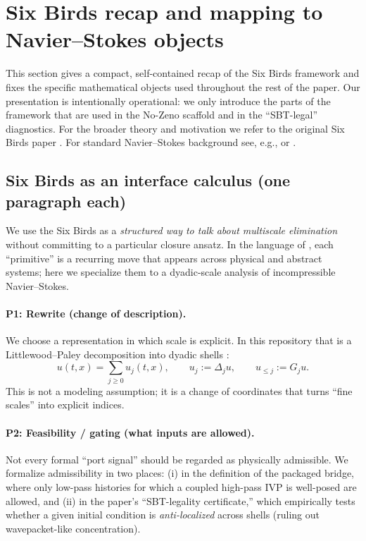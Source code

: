 \documentclass[11pt]{article}
\begin{document}
 \section{Six Birds recap and mapping to Navier--Stokes objects}
\label{sec:six_primitives_mapping}

This section gives a compact, self-contained recap of the Six Birds framework and fixes the specific mathematical objects used throughout the rest of the paper. Our presentation is intentionally operational: we only introduce the parts of the framework that are used in the No-Zeno scaffold and in the ``SBT-legal'' diagnostics. For the broader theory and motivation we refer to the original Six Birds paper \citep{tsiokos_2026_18365949}. For standard Navier--Stokes background see, e.g., \citet{temam_ns} or \citet{majda_bertozzi_vif}.

\subsection{Six Birds as an interface calculus (one paragraph each)}
\label{sec:six_primitives_recap}

We use the Six Birds as a \emph{structured way to talk about multiscale elimination} without committing to a particular closure ansatz. In the language of \citet{tsiokos_2026_18365949}, each ``primitive'' is a recurring move that appears across physical and abstract systems; here we specialize them to a dyadic-scale analysis of incompressible Navier--Stokes.

\paragraph{P1: Rewrite (change of description).}
We choose a representation in which scale is explicit. In this repository that is a Littlewood--Paley decomposition into dyadic shells \citep{bahouri2011fourier}:
\[
u(t,x)=\sum_{j\ge 0} u_j(t,x),\qquad u_j:=\Delta_j u,\qquad u_{\le j}:=G_j u.
\]
This is not a modeling assumption; it is a change of coordinates that turns ``fine scales'' into explicit indices.

\paragraph{P2: Feasibility / gating (what inputs are allowed).}
Not every formal ``port signal'' should be regarded as physically admissible. We formalize admissibility in two places:
(i) in the definition of the packaged bridge, where only low-pass histories for which a coupled high-pass IVP is well-posed are allowed, and
(ii) in the paper's ``SBT-legality certificate,'' which empirically tests whether a given initial condition is \emph{anti-localized} across shells (ruling out wavepacket-like concentration).
\end{document}
